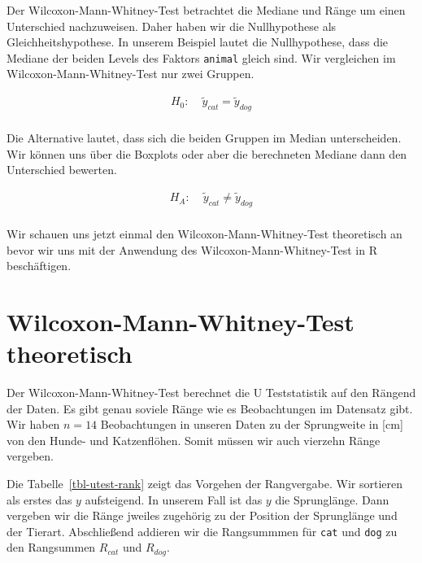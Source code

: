 \documentclass[
  letterpaper,
]{scrbook}
\begin{document}
Der Wilcoxon-Mann-Whitney-Test betrachtet die Mediane und Ränge um einen
Unterschied nachzuweisen. Daher haben wir die Nullhypothese als
Gleichheitshypothese. In unserem Beispiel lautet die Nullhypothese, dass
die Mediane der beiden Levels des Faktors \texttt{animal} gleich sind.
Wir vergleichen im Wilcoxon-Mann-Whitney-Test nur zwei Gruppen.

\[
\begin{align*}
H_0: &\; \widetilde{y}_{cat} = \widetilde{y}_{dog}\\
\end{align*}
\]

Die Alternative lautet, dass sich die beiden Gruppen im Median
unterscheiden. Wir können uns über die Boxplots oder aber die
berechneten Mediane dann den Unterschied bewerten.

\[
\begin{align*}
H_A: &\; \widetilde{y}_{cat} \ne \widetilde{y}_{dog}\\
\end{align*}
\]

Wir schauen uns jetzt einmal den Wilcoxon-Mann-Whitney-Test theoretisch
an bevor wir uns mit der Anwendung des Wilcoxon-Mann-Whitney-Test in R
beschäftigen.

\hypertarget{wilcoxon-mann-whitney-test-theoretisch}{%
\section{Wilcoxon-Mann-Whitney-Test
theoretisch}\label{wilcoxon-mann-whitney-test-theoretisch}}

Der Wilcoxon-Mann-Whitney-Test berechnet die U Teststatistik auf den
Rängend der Daten. Es gibt genau soviele Ränge wie es Beobachtungen im
Datensatz gibt. Wir haben \(n = 14\) Beobachtungen in unseren Daten zu
der Sprungweite in {[}cm{]} von den Hunde- und Katzenflöhen. Somit
müssen wir auch vierzehn Ränge vergeben.

Die Tabelle~\ref{tbl-utest-rank} zeigt das Vorgehen der Rangvergabe. Wir
sortieren als erstes das \(y\) aufsteigend. In unserem Fall ist das
\(y\) die Sprunglänge. Dann vergeben wir die Ränge jweiles zugehörig zu
der Position der Sprunglänge und der Tierart. Abschließend addieren wir
die Rangsummmen für \texttt{cat} und \texttt{dog} zu den Rangsummen
\(R_{cat}\) und \(R_{dog}\).
\end{document}
